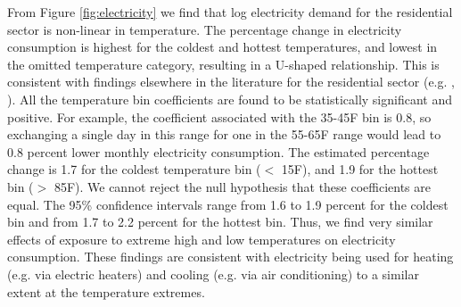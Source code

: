 \documentclass[11pt]{article}
\begin{document}
From Figure \ref{fig:electricity} we find that log electricity demand for the residential sector is non-linear in temperature. The percentage change in electricity consumption is highest for the coldest and hottest temperatures, and lowest in the omitted temperature category, resulting in a U-shaped relationship. This is consistent with findings elsewhere in the literature for the residential sector (e.g. \cite{Auffhammer2011}, \cite{Green2011}). All the temperature bin coefficients are found to be statistically significant and positive. %
For example, the coefficient associated with the 35-45\degree F bin is 0.8, so exchanging a single day in this range for one in the 55-65\degree F range would lead to 0.8 percent lower monthly electricity consumption. The estimated percentage change is 1.7 for the coldest temperature bin ($<$ 15\degree F), and 1.9 for the hottest bin ($>$ 85\degree F). We cannot reject the null hypothesis that these coefficients are equal. The 95\% confidence intervals range from 1.6 to 1.9 percent for the coldest bin and from 1.7 to 2.2 percent for the hottest bin. Thus, we find very similar effects of exposure to extreme high and low temperatures on electricity consumption. These findings are consistent with electricity being used for heating (e.g. via electric heaters) and cooling (e.g. via air conditioning) to a similar extent at the temperature extremes.  
\end{document}
